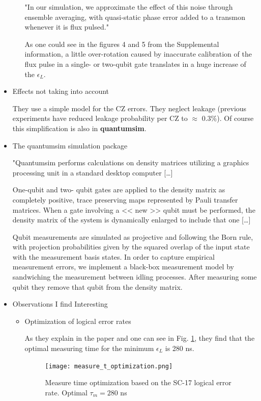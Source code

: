 \begin{itemize}
\begin{itemize}
"In our simulation, we approximate the effect of this noise through ensemble averaging, with quasi-static phase error added to a transmon whenever it is flux pulsed."

As one could see in the figures 4 and 5 from the Supplemental information, a little over-rotation  caused by inaccurate calibration of the flux pulse in a single- or two-qubit gate translates in a huge increase of the \(\epsilon_L\).
\end{itemize}


\item Effects not taking into account
\label{sec:org782ab3a}

They use a simple model for the CZ errors.
They neglect leakage (previous experiments have reduced leakage probability per CZ to \(\approx\) 0.3\%).
Of course this simplification is also in \textbf{quantumsim}.

\item The quantumsim simulation package
\label{sec:orgbb1f590}

"Quantumsim performs calculations on density matrices utilizing a graphics processing unit in a standard desktop computer [\ldots{}]

One-qubit and two- qubit gates are applied to the density matrix as completely positive, trace preserving maps represented by Pauli transfer matrices. When a gate involving a << new >> qubit must be performed, the density matrix of the system is dynamically enlarged to include that one [\ldots{}]

Qubit measurements are simulated as projective and following the Born rule, with projection probabilities given by the squared overlap of the input state with the measurement basis states. In order to capture empirical measurement errors, we implement a black-box measurement model by sandwiching the measurement between idling processes. After measuring some qubit they remove that qubit from the density matrix.


\item Observations I find Interesting
\label{sec:orge3b225d}
\begin{itemize}
\item Optimization of logical error rates
\label{sec:orgb1034dd}

As they explain in the paper and one can see in Fig. \ref{fig:org8cc3aa6}, they find that the optimal measuring time for the minimum \(\epsilon_L\) is 280 ns.

\begin{figure}[htbp]
\centering
\texttt{[image: measure\_t\_optimization.png]}
\caption{\label{fig:org8cc3aa6}
Measure time optimization based on the SC-17 logical error rate. Optimal \(\tau_m = 280\) ns}
\end{figure}



\end{itemize}
\end{itemize}
